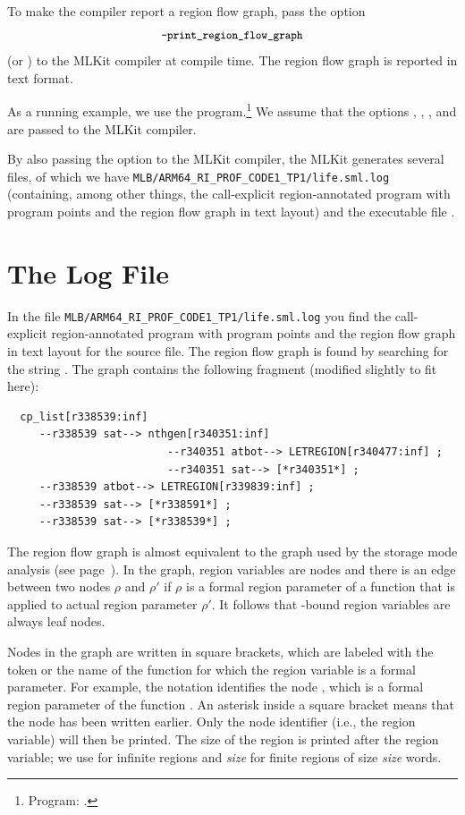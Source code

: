 \documentclass[12pt]{book}
\begin{document}
To make the compiler report a region flow graph, pass the option
%
%
%
$$\mbox{\small\ttfamily-print\_region\_flow\_graph}$$ (or ) to the MLKit compiler at
compile time. The region flow graph is reported in text format.

As a running example, we use the
%
%
%
 program.\footnote{Program: .}  We assume that
the options , , , and  are passed to the
MLKit compiler.

By also passing the option  to the MLKit compiler, the MLKit
generates several files, of which we have \lstinline{MLB/ARM64_RI_PROF_CODE1_TP1/life.sml.log} (containing, among
other things, the call-explicit region-annotated program with program points and
the region flow graph in text layout) and the executable file .

\section{The Log File}
In the file \lstinline{MLB/ARM64_RI_PROF_CODE1_TP1/life.sml.log} you find the call-explicit region-annotated
program with program points and the region flow graph in text layout for the
 source file.  The region flow graph is found by searching for the
string . The graph contains the following
fragment (modified slightly to fit here):\label{reg_flow_graph.ex}
{\small
\begin{verbatim}
  cp_list[r338539:inf]
     --r338539 sat--> nthgen[r340351:inf]
                         --r340351 atbot--> LETREGION[r340477:inf] ;
                         --r340351 sat--> [*r340351*] ;
     --r338539 atbot--> LETREGION[r339839:inf] ;
     --r338539 sat--> [*r338591*] ;
     --r338539 sat--> [*r338539*] ;
\end{verbatim}
}
The region flow graph is almost equivalent to the graph used by the storage mode
analysis (see page~\pageref{region flow graph}). In the graph, region variables
are nodes and there is an edge between two nodes $\rho$ and $\rho'$ if $\rho$ is
a formal region parameter of a function that is applied to actual region
parameter $\rho'$. It follows that -bound region variables are always
leaf nodes.

Nodes in the graph are written in square brackets, which are labeled with the
token  or the name of the function for which the region variable
is a formal parameter. For example, the notation 
identifies the node , which is a formal region parameter of the
function .  An asterisk inside a square bracket means that the node
has been written earlier.  Only the node identifier (i.e., the region variable)
will then be printed. The size of the region is printed after the region
variable; we use  for infinite regions and \emph{size} for finite
regions of size \emph{size} words.
\end{document}
